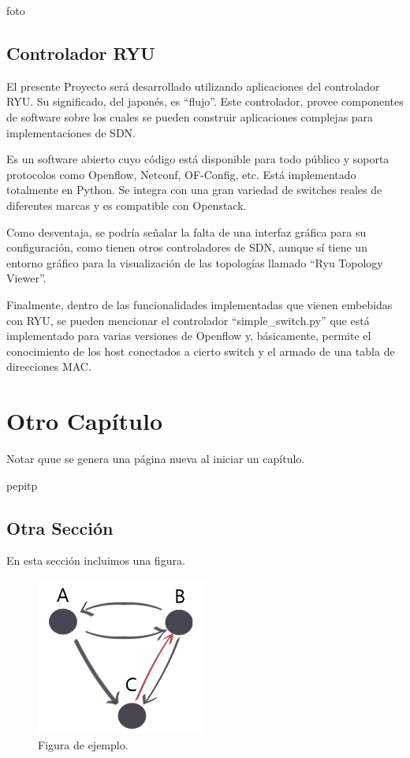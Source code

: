 \documentclass[12pt,a4paper,oneside]{book}
\begin{document}
foto



\section{Controlador RYU}

El presente Proyecto será desarrollado utilizando aplicaciones del controlador RYU. Su significado, del japonés, es “flujo”. Este controlador, provee componentes de software sobre los cuales se pueden construir aplicaciones complejas para implementaciones de SDN. 

Es un software abierto cuyo código está disponible para todo público y soporta protocolos como Openflow, Netconf, OF-Config, etc. Está implementado totalmente en Python. Se integra con una gran variedad de switches reales de diferentes marcas y es compatible con Openstack.

Como desventaja, se podría señalar la falta de una interfaz gráfica para su configuración, como tienen otros controladores de SDN, aunque sí tiene un entorno gráfico para la visualización de las topologías llamado “Ryu Topology Viewer”.

Finalmente, dentro de las funcionalidades implementadas que vienen embebidas con RYU, se pueden mencionar el controlador “simple_switch.py” que está implementado para varias versiones de Openflow y, básicamente, permite el conocimiento de los host conectados a cierto switch y el armado de una tabla de direcciones MAC.


\chapter{Otro Capítulo}

Notar quue se genera una página nueva al iniciar un capítulo.

pepitp
\section{Otra Sección}

En esta sección incluimos una figura.
\begin{figure}[ht]
 \centering
 \includegraphics[width=0.5\textwidth]{grafo.png}
 \caption{Figura de ejemplo.}
 \label{fig1}
\end{figure}
\end{document}
